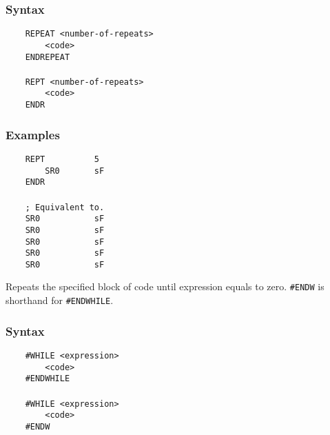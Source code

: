     \subsubsection{Syntax}
        \verb'    REPEAT <number-of-repeats>'\\
        \verb'        <code>'\\
        \verb'    ENDREPEAT'\\
        \verb''\\
        \verb'    REPT <number-of-repeats>'\\
        \verb'        <code>'\\
        \verb'    ENDR'

    \subsubsection{Examples}
        \verb'    REPT          5'\\
        \verb'        SR0       sF'\\
        \verb'    ENDR'\\
        \verb''\\
        \verb'    ; Equivalent to.'\\
        \verb'    SR0           sF'\\
        \verb'    SR0           sF'\\
        \verb'    SR0           sF'\\
        \verb'    SR0           sF'\\
        \verb'    SR0           sF'

\clearpage
{}
    Repeats the specified block of code until expression equals to zero. \texttt{\#ENDW} is shorthand for \texttt{\#ENDWHILE}.

    \subsubsection{Syntax}
        \verb'    #WHILE <expression>'\\
        \verb'        <code>'\\
        \verb'    #ENDWHILE'\\
        \verb''\\
        \verb'    #WHILE <expression>'\\
        \verb'        <code>'\\
        \verb'    #ENDW'

